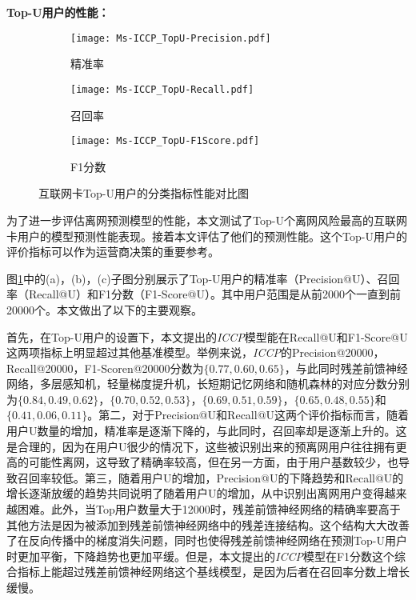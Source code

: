 \textbf{Top-U用户的性能：}

\begin{figure}[!htb]
    \centering
    \begin{subfigure}[t]{0.49\linewidth}
	\captionsetup{justification=centering} %
	\begin{minipage}[b]{1\linewidth}
		\texttt{[image: Ms-ICCP\_TopU-Precision.pdf]}
		\caption{精准率}
	\end{minipage}
\end{subfigure}
\begin{subfigure}[t]{0.49\linewidth}
	\captionsetup{justification=centering} %
	\begin{minipage}[b]{1\linewidth}
		\texttt{[image: Ms-ICCP\_TopU-Recall.pdf]}
		\caption{召回率}
	\end{minipage}
\end{subfigure}
\begin{subfigure}[t]{0.75\linewidth}
	\captionsetup{justification=centering} %
	\begin{minipage}[b]{1\linewidth}
		\texttt{[image: Ms-ICCP\_TopU-F1Score.pdf]}
		\caption{F1分数}
	\end{minipage}
\end{subfigure}
    \caption{互联网卡Top-U用户的分类指标性能对比图}
    \label{Fig:TopU}
\end{figure}


为了进一步评估离网预测模型的性能，本文测试了Top-U个离网风险最高的互联网卡用户的模型预测性能表现。接着本文评估了他们的预测性能。这个Top-U用户的评价指标可以作为运营商决策的重要参考。\par
图\ref{Fig:TopU}中的(a)，(b)，(c)子图分别展示了Top-U用户的精准率（Precision@U）、召回率（Recall@U）和F1分数（F1-Score@U）。其中用户范围是从前2000个一直到前20000个。本文做出了以下的主要观察。\par
首先，在Top-U用户的设置下，本文提出的\emph{ICCP}模型能在Recall@U和F1-Score@U这两项指标上明显超过其他基准模型。举例来说，\emph{ICCP}的Precision@20000，Recall@20000，F1-Scoren@20000分数为$\{ 0.77, 0.60, 0.65\}$，与此同时残差前馈神经网络，多层感知机，轻量梯度提升机，长短期记忆网络和随机森林的对应分数分别为$\{ 0.84, 0.49, 0.62\}$，$\{ 0.70, 0.52, 0.53\}$，$\{ 0.69, 0.51, 0.59\}$，$\{ 0.65, 0.48, 0.55\}$和$\{ 0.41, 0.06, 0.11\}$。第二，对于Precision@U和Recall@U这两个评价指标而言，随着用户U数量的增加，精准率是逐渐下降的，与此同时，召回率却是逐渐上升的。这是合理的，因为在用户U很少的情况下，这些被识别出来的预离网用户往往拥有更高的可能性离网，这导致了精确率较高，但在另一方面，由于用户基数较少，也导致召回率较低。第三，随着用户U的增加，Precision@U的下降趋势和Recall@U的增长逐渐放缓的趋势共同说明了随着用户U的增加，从中识别出离网用户变得越来越困难。此外，当Top用户数量大于12000时，残差前馈神经网络的精确率要高于其他方法是因为被添加到残差前馈神经网络中的残差连接结构。这个结构大大改善了在反向传播中的梯度消失问题，同时也使得残差前馈神经网络在预测Top-U用户时更加平衡，下降趋势也更加平缓。但是，本文提出的\emph{ICCP}模型在F1分数这个综合指标上能超过残差前馈神经网络这个基线模型，是因为后者在召回率分数上增长缓慢。







